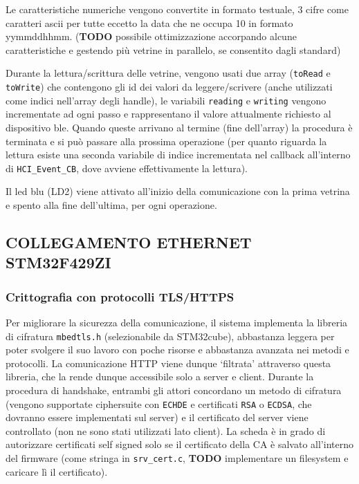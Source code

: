 Le caratteristiche numeriche vengono convertite in formato testuale, 3 cifre come caratteri ascii per tutte eccetto la data che ne occupa 10 in formato yymmddhhmm. (\textbf{TODO} possibile ottimizzazione accorpando alcune caratteristiche e gestendo pi\`u vetrine in parallelo, se consentito dagli standard)

Durante la lettura/scrittura delle vetrine, vengono usati due array (\texttt{toRead} e \texttt{toWrite}) che contengono gli id dei valori da leggere/scrivere (anche utilizzati come indici nell'array degli handle), le variabili \texttt{reading} e \texttt{writing} vengono incrementate ad ogni passo e rappresentano il valore attualmente richiesto al dispositivo ble. Quando queste arrivano al termine (fine dell'array) la procedura \`e terminata e si pu\`o passare alla prossima operazione (per quanto riguarda la lettura esiste una seconda variabile di indice incrementata nel callback all'interno di \texttt{HCI\_Event\_CB}, dove avviene effettivamente la lettura).

Il led blu (LD2) viene attivato all'inizio della comunicazione con la prima vetrina e spento alla fine dell'ultima, per ogni operazione.

\subsection{COLLEGAMENTO ETHERNET STM32F429ZI}

\subsubsection{Crittografia con protocolli TLS/HTTPS}

Per migliorare la sicurezza della comunicazione, il sistema implementa la libreria di cifratura \texttt{mbedtls.h} (selezionabile da STM32cube), abbastanza leggera per poter svolgere il suo lavoro con poche risorse e abbastanza avanzata nei metodi e protocolli. La comunicazione HTTP viene dunque `filtrata' attraverso questa libreria, che la rende dunque accessibile solo a server e client. Durante la procedura di handshake, entrambi gli attori concordano un metodo di cifratura (vengono supportate ciphersuite con \texttt{ECHDE} e certificati \texttt{RSA} o \texttt{ECDSA}, che dovranno essere implementati sul server) e il certificato del server viene controllato (non ne sono stati utilizzati lato client). La scheda \`e in grado di autorizzare certificati self signed solo se il certificato della CA \`e salvato all'interno del firmware (come stringa in \texttt{srv\_cert.c}, \textbf{TODO} implementare un filesystem e caricare l\`i il certificato).

